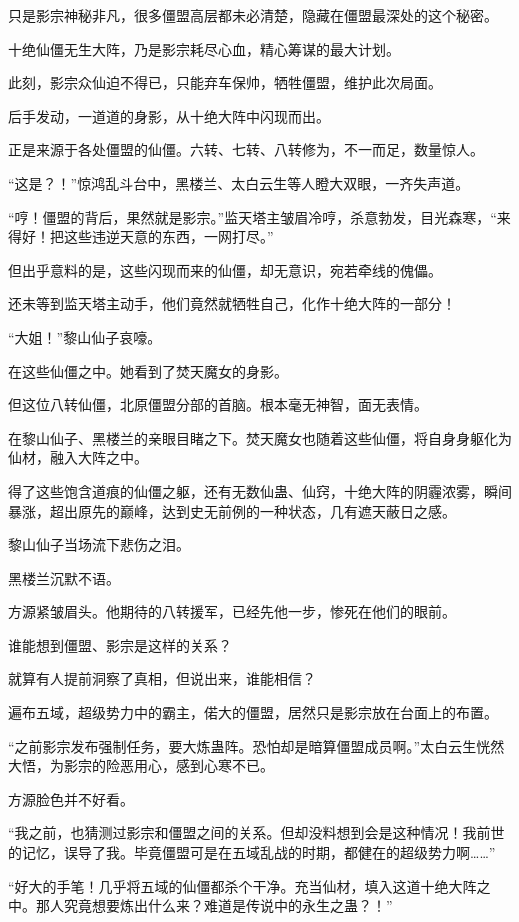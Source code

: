 \begin{this_body}
只是影宗神秘非凡，很多僵盟高层都未必清楚，隐藏在僵盟最深处的这个秘密。

十绝仙僵无生大阵，乃是影宗耗尽心血，精心筹谋的最大计划。

此刻，影宗众仙迫不得已，只能弃车保帅，牺牲僵盟，维护此次局面。

后手发动，一道道的身影，从十绝大阵中闪现而出。

正是来源于各处僵盟的仙僵。六转、七转、八转修为，不一而足，数量惊人。

“这是？！”惊鸿乱斗台中，黑楼兰、太白云生等人瞪大双眼，一齐失声道。

“哼！僵盟的背后，果然就是影宗。”监天塔主皱眉冷哼，杀意勃发，目光森寒，“来得好！把这些违逆天意的东西，一网打尽。”

但出乎意料的是，这些闪现而来的仙僵，却无意识，宛若牵线的傀儡。

还未等到监天塔主动手，他们竟然就牺牲自己，化作十绝大阵的一部分！

“大姐！”黎山仙子哀嚎。

在这些仙僵之中。她看到了焚天魔女的身影。

但这位八转仙僵，北原僵盟分部的首脑。根本毫无神智，面无表情。

在黎山仙子、黑楼兰的亲眼目睹之下。焚天魔女也随着这些仙僵，将自身身躯化为仙材，融入大阵之中。

得了这些饱含道痕的仙僵之躯，还有无数仙蛊、仙窍，十绝大阵的阴霾浓雾，瞬间暴涨，超出原先的巅峰，达到史无前例的一种状态，几有遮天蔽日之感。

黎山仙子当场流下悲伤之泪。

黑楼兰沉默不语。

方源紧皱眉头。他期待的八转援军，已经先他一步，惨死在他们的眼前。

谁能想到僵盟、影宗是这样的关系？

就算有人提前洞察了真相，但说出来，谁能相信？

遍布五域，超级势力中的霸主，偌大的僵盟，居然只是影宗放在台面上的布置。

“之前影宗发布强制任务，要大炼蛊阵。恐怕却是暗算僵盟成员啊。”太白云生恍然大悟，为影宗的险恶用心，感到心寒不已。

方源脸色并不好看。

“我之前，也猜测过影宗和僵盟之间的关系。但却没料想到会是这种情况！我前世的记忆，误导了我。毕竟僵盟可是在五域乱战的时期，都健在的超级势力啊……”

“好大的手笔！几乎将五域的仙僵都杀个干净。充当仙材，填入这道十绝大阵之中。那人究竟想要炼出什么来？难道是传说中的永生之蛊？！”


\end{this_body}
